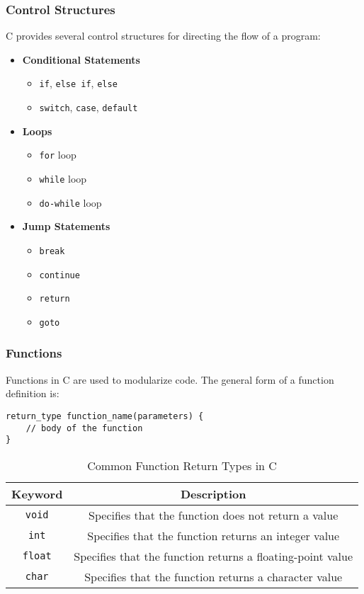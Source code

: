 \subsubsection{Control Structures}
C provides several control structures for directing the flow of a program:

\begin{itemize}
    \item \textbf{Conditional Statements}
        \begin{itemize}
            \item \texttt{if}, \texttt{else if}, \texttt{else}
            \item \texttt{switch}, \texttt{case}, \texttt{default}
        \end{itemize}
    \item \textbf{Loops}
        \begin{itemize}
            \item \texttt{for} loop
            \item \texttt{while} loop
            \item \texttt{do-while} loop
        \end{itemize}
    \item \textbf{Jump Statements}
        \begin{itemize}
            \item \texttt{break}
            \item \texttt{continue}
            \item \texttt{return}
            \item \texttt{goto}
        \end{itemize}
\end{itemize}

\subsubsection{Functions}
Functions in C are used to modularize code. The general form of a function definition is:

\begin{verbatim}
return_type function_name(parameters) {
    // body of the function
}
\end{verbatim}

\begin{table}[h!]
\centering
\begin{tabular}{|c|c|}
\hline
\textbf{Keyword} & \textbf{Description} \\
\hline
\texttt{void} & Specifies that the function does not return a value \\
\texttt{int} & Specifies that the function returns an integer value \\
\texttt{float} & Specifies that the function returns a floating-point value \\
\texttt{char} & Specifies that the function returns a character value \\
\hline
\end{tabular}
\caption{Common Function Return Types in C}
\label{table:function_return_types}
\end{table}

